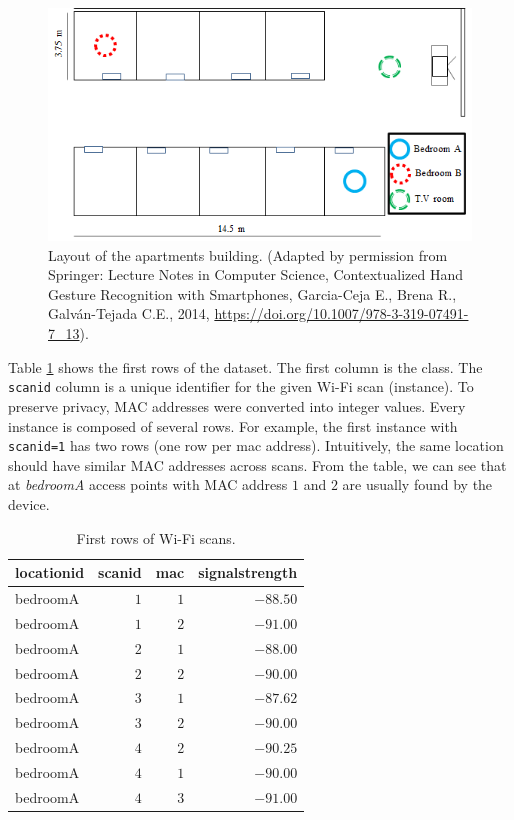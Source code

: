 \documentclass[
  11pt,
]{krantz}
\begin{document}
\begin{figure}

{\centering \includegraphics[width=0.9\linewidth]{images/layout} 

}

\caption{Layout of the apartments building. (Adapted by permission from Springer: Lecture Notes in Computer Science, Contextualized Hand Gesture Recognition with Smartphones, Garcia-Ceja E., Brena R., Galván-Tejada C.E., 2014, \url{https://doi.org/10.1007/978-3-319-07491-7_13}).}\label{fig:layoutHouse}
\end{figure}

Table \ref{tab:headWifi} shows the first rows of the dataset. The first column is the class. The \texttt{scanid} column is a unique identifier for the given Wi-Fi scan (instance). To preserve privacy, MAC addresses were converted into integer values. Every instance is composed of several rows. For example, the first instance with \texttt{scanid=1} has two rows (one row per mac address). Intuitively, the same location should have similar MAC addresses across scans. From the table, we can see that at \emph{bedroomA} access points with MAC address \(1\) and \(2\) are usually found by the device.

\begin{table}

\caption{\label{tab:headWifi}First rows of Wi-Fi scans.}
\centering
\begin{tabular}[t]{lrrr}
\toprule
\textbf{locationid} & \textbf{scanid} & \textbf{mac} & \textbf{signalstrength}\\
\midrule
bedroomA & $1$ & $1$ & $-88.50$\\
bedroomA & $1$ & $2$ & $-91.00$\\
bedroomA & $2$ & $1$ & $-88.00$\\
bedroomA & $2$ & $2$ & $-90.00$\\
bedroomA & $3$ & $1$ & $-87.62$\\
\addlinespace
bedroomA & $3$ & $2$ & $-90.00$\\
bedroomA & $4$ & $2$ & $-90.25$\\
bedroomA & $4$ & $1$ & $-90.00$\\
bedroomA & $4$ & $3$ & $-91.00$\\
\bottomrule
\end{tabular}
\end{table}
\end{document}
